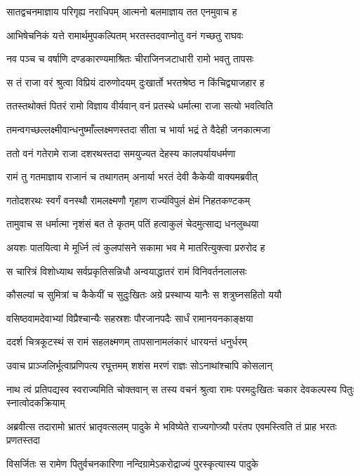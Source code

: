 \twolineshloka
{सातद्वचनमाज्ञाय परिगृह्य नराधिपम्}
{आत्मनो बलमाज्ञाय तत एनमुवाच ह}


\twolineshloka
{आभिषेचनिकं यत्ते रामार्थमुपकल्पितम्}
{भरतस्तदवाप्नोतु वनं गच्छतु राघवः}


\twolineshloka
{नव पञ्च च वर्षाणि दण्डकारण्यमाश्रितः}
{चीराजिनजटाधारी रामो भवतु तापसः}


\twolineshloka
{स तं राजा वरं श्रुत्वा विप्रियं दारुणोदयम्}
{दुःखार्तो भरतश्रेष्ठ न किंचिद्व्याजहार ह}


\twolineshloka
{ततस्तथोक्तं पितरं रामो विज्ञाय वीर्यवान्}
{वनं प्रतस्थे धर्मात्मा राजा सत्यो भवत्विति}


\twolineshloka
{तमन्वगच्छल्लक्ष्मीवान्धनुष्माँल्लक्ष्मणस्तदा}
{सीता च भार्या भद्रं ते वैदेही जनकात्मजा}


\twolineshloka
{ततो वनं गतेरामे राजा दशरथस्तदा}
{समयुज्यत देहस्य कालपर्यायधर्मणा}


\twolineshloka
{रामं तु गतमाज्ञाय राजानं च तथागतम्}
{अनार्या भरतं देवी कैकेयी वाक्यमब्रवीत्}


\twolineshloka
{गतोदशरथः स्वर्गं वनस्थौ रामलक्ष्मणौ}
{गृहाण राज्यंविपुलं क्षेमं निहतकण्टकम्}


\twolineshloka
{तामुवाच स धर्मात्मा नृशंसं बत ते कृतम्}
{पतिं हत्वाकुलं चेदमुत्साद्य धनलुब्धया}


\twolineshloka
{अयशः पातयित्वा मे मूर्ध्नि त्वं कुलपांसने}
{सकामा भव मे मातरित्युक्त्वा प्ररुरोद ह}


\twolineshloka
{स चारित्रं विशोध्याथ सर्वप्रकृतिसन्निधौ}
{अन्वयाद्धातरं रामं विनिवर्तनलालसः}


\twolineshloka
{कौसल्यां च सुमित्रां च कैकेयीं च सुदुःखितः}
{अग्रे प्रस्थाप्य यानैः स शत्रुघ्नसहितो ययौ}


\twolineshloka
{वसिष्ठवामदेवाभ्यां विप्रैश्चान्यैः सहस्रशः}
{पौरजानपदैः सार्धं रामानयनकाङ्क्षया}


\twolineshloka
{ददर्श चित्रकूटस्थं स रामं सहलक्ष्मणम्}
{तापसानामलंकारं धारयन्तं धनुर्धरम्}


\twolineshloka
{उवाच प्राञ्जलिर्भूत्वाप्रणिपत्य रघूत्तमम्}
{शशंस मरणं राज्ञः सोऽनाथांश्चापि कोसलान्}


नाथ त्वं प्रतिपद्यस्व स्वराज्यमिति चोक्तवान्
\twolineshloka
{स तस्य वचनं श्रुत्वा रामः परमदुःखितः}
{चकार देवकल्पस्य पितुः स्नात्वोदकक्रियाम्}


\threelineshloka
{अब्रवीत्स तदारामो भ्रातरं भ्रातृवत्सलम्}
{पादुके मे भविष्येते राज्यगोप्त्र्यौ परंतप}
{एवमस्त्विति तं प्राह भरतः प्रणतस्तदा}


\twolineshloka
{विसर्जितः स रामेण पितुर्वचनकारिणा}
{नन्दिग्रामेऽकरोद्राज्यं पुरस्कृत्यास्य पादुके}


